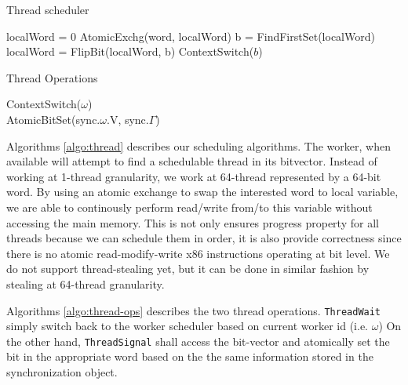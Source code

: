 \documentclass{sig-alternate-05-2015}
\begin{document}
\begin{algorithm}
  \caption{Thread scheduler}
  \label{algo:thread}
  \begin{algorithmic}[1]
     
     
        \State localWord = 0
        \State AtomicExchg(word, localWord)
          \State b = FindFirstSet(localWord)
          \State localWord = FlipBit(localWord, b)
          \State ContextSwitch($b$)
        \EndWhile
      \EndIf
      \EndFor
    \EndWhile
    \EndProcedure
  \end{algorithmic}
\end{algorithm}

\begin{algorithm}
  \caption{Thread Operations}
  \label{algo:thread-ops}
  \begin{algorithmic}[1]
      \State ContextSwitch($\omega$)
    \EndProcedure
    \\ 
      \State AtomicBitSet(sync.$\omega$.V, sync.$\Gamma$)
    \EndProcedure
  \end{algorithmic}
\end{algorithm}

Algorithms \ref{algo:thread} describes our scheduling algorithms. The
worker, when available will attempt to find a schedulable thread in its bitvector.
Instead of working at 1-thread granularity, we work
at 64-thread represented by a 64-bit word. By using an atomic exchange to swap
the interested word to local variable, we are able to continously perform
read/write from/to this variable without accessing the main memory.  This is
not only ensures progress property for all threads because we can schedule them
in order, it is also provide correctness since there is no atomic
read-modify-write x86 instructions operating at bit level.  We do not support
thread-stealing yet, but it can be done in similar fashion by stealing at 64-thread
granularity.

Algorithms \ref{algo:thread-ops} describes the two thread operations.
\texttt{ThreadWait} simply switch back to the worker scheduler based on current worker id (i.e. $\omega$)
On the other hand, \texttt{ThreadSignal} shall access the
bit-vector and atomically set the bit in the appropriate word based on the
the same information stored in the synchronization object.
\end{document}
